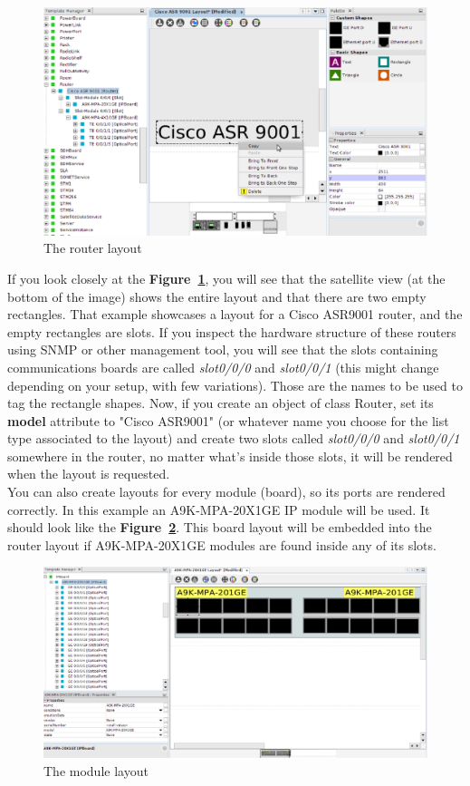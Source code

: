 \documentclass[a4paper]{article}
\begin{document}
	\begin{figure}[h!]
		\centering
		\includegraphics[width=0.9\linewidth]{img/device_layout_edited.png}
		\caption{The router layout}
		\label{fig:device_layout_edited}
	\end{figure}
	\newpage
	If you look closely at the \textbf{Figure~\ref{fig:device_layout_edited}}, you will see that the satellite view (at the bottom of the image) shows the entire layout and that there are two empty rectangles. That example showcases a layout for a Cisco ASR9001 router, and the empty rectangles are slots. If you inspect the hardware structure of these routers using SNMP or other management tool, you will see that the slots containing communications boards are called \textit{slot0/0/0} and \textit{slot0/0/1} (this might change depending on your setup, with few variations). Those are the names to be used to tag the rectangle shapes. Now, if you create an object of class Router, set its \textbf{model} attribute to "Cisco ASR9001" (or whatever name you choose for the list type associated to the layout) and create two slots called \textit{slot0/0/0} and \textit{slot0/0/1} somewhere in the router, no matter what's inside those slots, it will be rendered when the layout is requested.\\
	\newline
	You can also create layouts for every module (board), so its ports are rendered correctly. In this example an A9K-MPA-20X1GE IP module will be used. It should look like the \textbf{Figure~\ref{fig:device_layout_ipboard}}. This board layout will be embedded into the router layout if A9K-MPA-20X1GE modules are found inside any of its slots.
	
	\begin{figure}[h!]
		\centering
		\includegraphics[width=0.99\linewidth]{img/device_layout_ipboard.png}
		\caption{The module layout}
		\label{fig:device_layout_ipboard}
	\end{figure}
    \newpage
    
\end{document}
